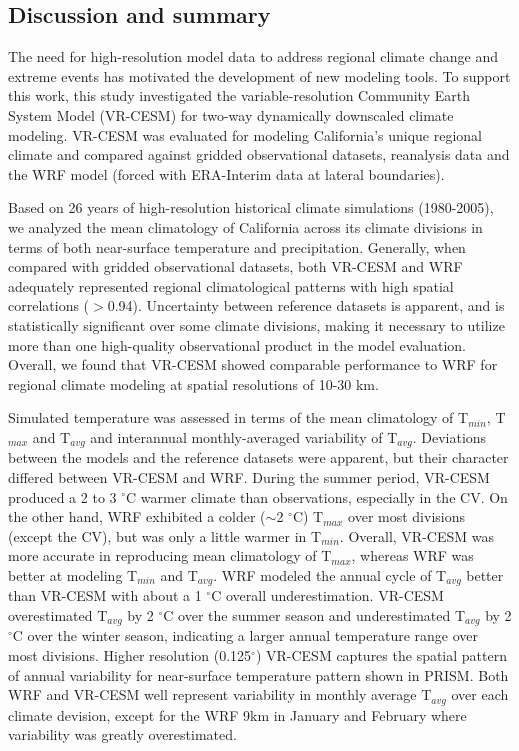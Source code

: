 \documentclass[ms,draft]{agutex}   %
\begin{document}
\begin{article}
\section{Discussion and summary} \label{sec:Discussion}

The need for high-resolution model data to address regional climate change and extreme events has motivated the development of new modeling tools.  To support this work, this study investigated the variable-resolution Community Earth System Model (VR-CESM) for two-way dynamically downscaled climate modeling.  VR-CESM was evaluated for modeling California's unique regional climate and compared against gridded observational datasets, reanalysis data and the WRF model (forced with ERA-Interim data at lateral boundaries).

Based on 26 years of high-resolution historical climate simulations (1980-2005), we analyzed the mean climatology of California across its climate divisions in terms of both near-surface temperature and precipitation. Generally, when compared with gridded observational datasets, both VR-CESM and WRF adequately represented regional climatological patterns with high spatial correlations ($>$0.94). Uncertainty between reference datasets is apparent, and is statistically significant over some climate divisions, making it necessary to utilize more than one high-quality observational product in the model evaluation. Overall, we found that VR-CESM showed comparable performance to WRF for regional climate modeling at spatial resolutions of 10-30 km.


Simulated temperature was assessed in terms of the mean climatology of T$_{min}$, T$_{max}$ and T$_{avg}$ and interannual monthly-averaged variability of T$_{avg}$.  Deviations between the models and the reference datasets were apparent, but their character differed between VR-CESM and WRF. During the summer period, VR-CESM produced a 2 to 3 $^\circ$C warmer climate than observations, especially in the CV. On the other hand, WRF exhibited a colder ($\sim$2 $^\circ$C) T$_{max}$ over most divisions (except the CV), but was only a little warmer in T$_{min}$. Overall, VR-CESM was more accurate in reproducing mean climatology of T$_{max}$, whereas WRF was better at modeling T$_{min}$ and T$_{avg}$. WRF modeled the annual cycle of T$_{avg}$ better than VR-CESM with about a 1 $^\circ$C overall underestimation. VR-CESM overestimated T$_{avg}$ by 2 $^\circ$C over the summer season and underestimated T$_{avg}$ by 2 $^\circ$C over the winter season, indicating a larger annual temperature range over most divisions. Higher resolution (0.125$^\circ$) VR-CESM captures the spatial pattern of annual variability for near-surface temperature pattern shown in PRISM. Both WRF and VR-CESM well represent variability in monthly average T$_{avg}$ over each climate devision, except for the WRF 9km in January and February where variability was greatly overestimated.



\end{article}
\end{document}
